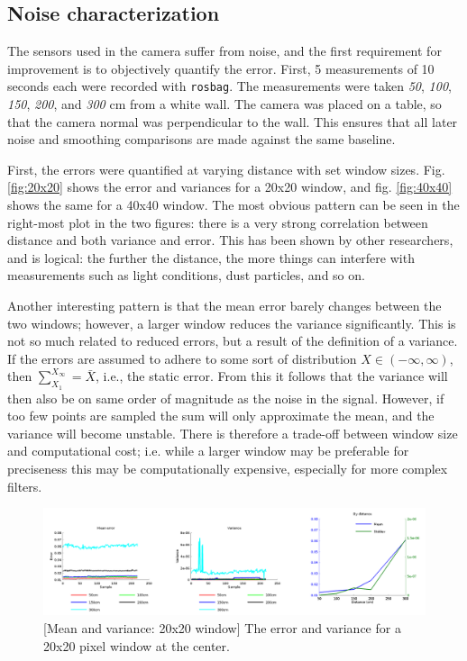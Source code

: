 \documentclass[11pt]{article}
\begin{document}


\subsection{Noise characterization}

The sensors used in the camera suffer from noise, and the first requirement for
improvement is to objectively quantify the error. First, 5 measurements of 10
seconds each were recorded with \texttt{rosbag}. The measurements were taken
\emph{50}, \emph{100}, \emph{150}, \emph{200}, and \emph{300} cm from a white
wall. The camera was placed on a table, so that the camera normal was
perpendicular to the wall. This ensures that all later noise and smoothing
comparisons are made against the same baseline. \par

First, the errors were quantified at varying distance with set window
sizes. Fig. \vref{fig:20x20} shows the error and variances for a 20x20 window,
and fig. \vref{fig:40x40} shows the same for a 40x40 window. The most obvious
pattern can be seen in the right-most plot in the two figures: there is a very
strong correlation between distance and both variance and error. This has been
shown by other researchers, and is logical: the further the distance, the more
things can interfere with measurements such as light conditions, dust particles,
and so on. \par

Another interesting pattern is that the mean error barely changes between the
two windows; however, a larger window reduces the variance significantly. This
is not so much related to reduced errors, but a result of the definition of a
variance. If the errors are assumed to adhere to some sort of distribution
$X \in \left(-\infty, \infty \right)$, then $\sum_{X_1}^{X_\infty} = \bar{X}$,
i.e., the static error. From this it follows that the variance will then also be
on same order of magnitude as the noise in the signal. However, if too few
points are sampled the sum will only approximate the mean, and the variance will
become unstable. There is therefore a trade-off between window size and
computational cost; i.e. while a larger window may be preferable for preciseness this may be
computationally expensive, especially for more complex filters. \par

\begin{figure}[ht]
  \includegraphics[width=1\textwidth]{figures/20x20-plot.png}
  [Mean and variance: 20x20 window]{\label{fig:20x20} The
    error and variance for a 20x20 pixel window at the center.}
\end{figure}
\end{document}
